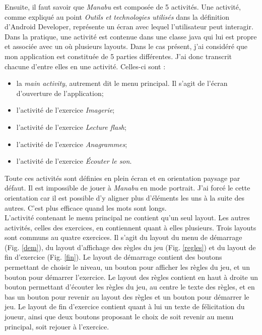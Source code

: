 Ensuite, il faut savoir que \textit{Manabu} est composée de 5 activités. Une activité, comme expliqué au point \textit{Outils et technologies utilisés} dans la définition d'Android Developer, représente un écran avec lequel l'utilisateur peut interagir. Dans la pratique, une activité est contenue dans une classe java qui lui est propre et associée avec un où plusieurs layouts. Dans le cas présent, j'ai considéré que mon application est constituée de 5 parties différentes. J'ai donc transcrit chacune d'entre elles en une activité. Celles-ci sont :
\begin{itemize}
\item la \textit{main activity}, autrement dit le menu principal. Il s'agit de l'écran d'ouverture de l'application;
\item l'activité de l'exercice \textit{Imagerie};
\item l'activité de l'exercice \textit{Lecture flash};
\item l'activité de l'exercice \textit{Anagrammes};
\item l'activité de l'exercice \textit{Écouter le son}.
\end{itemize}
Toute ces activités sont définies en plein écran et en orientation paysage par défaut. Il est impossible de jouer à \textit{Manabu} en mode portrait. J'ai forcé le cette orientation car il est possible d'y aligner plus d'éléments les uns à la suite des autres. C'est plus efficace quand les mots sont longs.\\

L'activité contenant le menu principal ne contient qu'un seul layout. Les autres activités, celles des exercices, en contiennent quant à elles plusieurs. Trois layouts sont communs au quatre exercices. Il s'agit du layout du menu de démarrage (Fig. \ref{dem}), du layout d'affichage des règles du jeu (Fig. \ref{regles}) et du layout de fin d'exercice (Fig. \ref{fin}). Le layout de démarrage contient des boutons permettant de choisir le niveau, un bouton pour afficher les règles du jeu, et un bouton pour démarrer l'exercice. Le layout des règles contient en haut à droite un bouton permettant d'écouter les règles du jeu, au centre le texte des règles, et en bas un bouton pour revenir au layout des règles et un bouton pour démarrer le jeu. Le layout de fin d'exercice contient quant à lui un texte de félicitation du joueur, ainsi que deux boutons proposant le choix de soit revenir au menu principal, soit rejouer à l'exercice.\\

